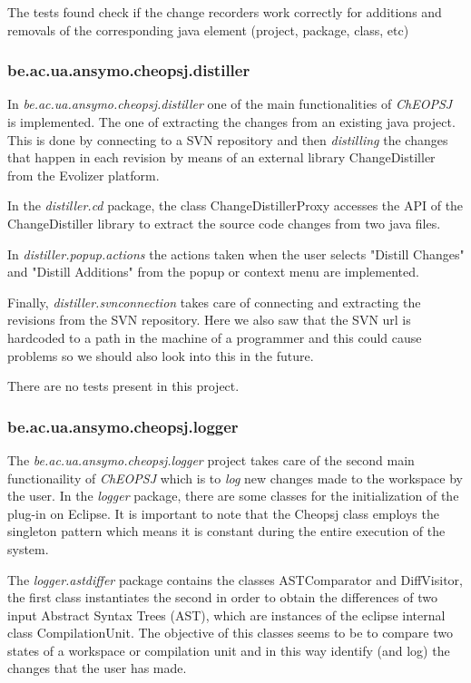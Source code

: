 \documentclass[a4paper]{article}
\begin{document}
The tests found check if the change recorders work correctly for additions and removals of the corresponding java element (project, package, class, etc)

\subsubsection{be.ac.ua.ansymo.cheopsj.distiller}
In \emph{be.ac.ua.ansymo.cheopsj.distiller} one of the main functionalities of \emph{ChEOPSJ} is implemented. The one of extracting the changes from an existing java project. This is done by connecting to a SVN repository and then \emph{distilling} the changes that happen in each revision by means of an external library ChangeDistiller from the Evolizer platform.

In the \emph{distiller.cd} package, the class ChangeDistillerProxy accesses the API of the ChangeDistiller library to extract the source code changes from two java files.

In \emph{distiller.popup.actions} the actions taken when the user selects "Distill Changes" and "Distill Additions" from the popup or context menu are implemented. 

Finally, \emph{distiller.svnconnection} takes care of connecting and extracting the revisions from the SVN repository. Here we also saw that the SVN url is hardcoded to a path in the machine of a programmer and this could cause problems so we should also look into this in the future.

There are no tests present in this project.

\subsubsection{be.ac.ua.ansymo.cheopsj.logger}
The \emph{be.ac.ua.ansymo.cheopsj.logger} project takes care of the second main functionaility of \emph{ChEOPSJ} which is to \emph{log} new changes made to the workspace by the user. In the \emph{logger} package, there are some classes for the initialization of the plug-in on Eclipse. It is important to note that the Cheopsj class employs the singleton pattern which means it is constant during the entire execution of the system.

The \emph{logger.astdiffer} package contains the classes ASTComparator and DiffVisitor, the first class instantiates the second in order to obtain the differences of two input Abstract Syntax Trees (AST), which are instances of the eclipse internal class CompilationUnit. The objective of this classes seems to be to compare two states of a workspace or compilation unit and in this way identify (and log) the changes that the user has made.
\end{document}
